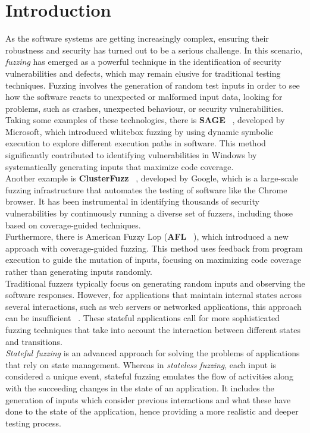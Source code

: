 \chapter{Introduction}

As the software systems are getting increasingly complex, ensuring their robustness and security has turned out to be a serious challenge. In this scenario, \textit{fuzzing} has emerged as a powerful technique in the identification of security vulnerabilities and defects, which may remain elusive for traditional testing techniques. Fuzzing involves the generation of random test inputs in order to see how the software reacts to unexpected or malformed input data, looking for problems, such as crashes, unexpected behaviour, or security vulnerabilities.
Taking some examples of these technologies, there is \textbf{SAGE} ~\cite{sage}, developed by Microsoft, which introduced whitebox fuzzing by using dynamic symbolic execution to explore different execution paths in software. This method significantly contributed to identifying vulnerabilities in Windows by systematically generating inputs that maximize code coverage.
\\Another example is \textbf{ClusterFuzz} ~\cite{ossfuzz}, developed by Google, which is a large-scale fuzzing infrastructure that automates the testing of software like the Chrome browser. It has been instrumental in identifying thousands of security vulnerabilities by continuously running a diverse set of fuzzers, including those based on coverage-guided techniques.
\\Furthermore, there is American Fuzzy Lop (\textbf{AFL} ~\cite{afl}), which introduced a new approach with coverage-guided fuzzing. This method uses feedback from program execution to guide the mutation of inputs, focusing on maximizing code coverage rather than generating inputs randomly.
\\Traditional fuzzers typically focus on generating random inputs and observing the software responses. However, for applications that maintain internal states across several interactions, such as web servers or networked applications, this approach can be insufficient ~\cite{statefulfuzzingchallenges}. These stateful applications call for more sophisticated fuzzing techniques that take into account the interaction between different states and transitions.
\\\textit{Stateful fuzzing} is an advanced approach for solving the problems of applications that rely on state management. Whereas in \textit{stateless fuzzing}, each input is considered a unique event, stateful fuzzing emulates the flow of activities along with the succeeding changes in the state of an application. It includes the generation of inputs which consider previous interactions and what these have done to the state of the application, hence providing a more realistic and deeper testing process.

